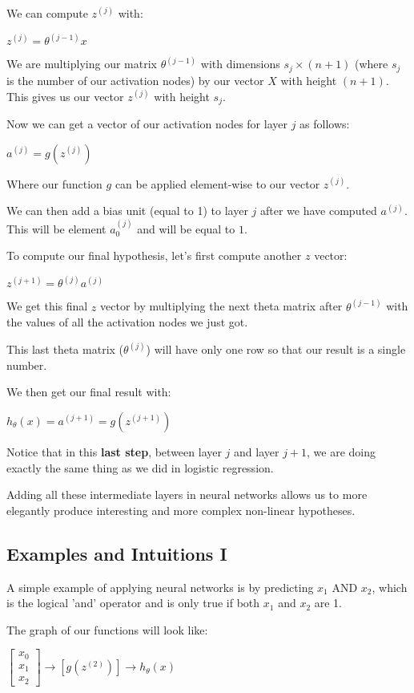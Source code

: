 \documentclass{article}
\begin{document}
We can compute $z^{(j)}$ with:

$z^{(j)}=\theta^{(j−1)}x$

We are multiplying our matrix $\theta^{(j−1)}$ with dimensions $s_j×(n+1)$ (where $s_j$ is the number of our activation nodes) by our vector $X$ with height $(n+1)$. This gives us our vector $z^{(j)}$ with height $s_j$.

Now we can get a vector of our activation nodes for layer $j$ as follows:

$a^{(j)}=g(z^{(j)})$

Where our function $g$ can be applied element-wise to our vector $z^{(j)}$.

We can then add a bias unit (equal to 1) to layer $j$ after we have computed $a^{(j)}$. This will be element $a_0^{(j)}$ and will be equal to $1$.

To compute our final hypothesis, let's first compute another $z$ vector:

$z^{(j+1)}=\theta^{(j)}a^{(j)}$

We get this final $z$ vector by multiplying the next theta matrix after $\theta^{(j−1)}$ with the values of all the activation nodes we just got.

This last theta matrix ($\theta^{(j)}$) will have only one row so that our result is a single number.

We then get our final result with:

$h_\theta(x)=a^{(j+1)}=g(z^{(j+1)})$

Notice that in this \textbf{last step}, between layer $j$ and layer $j+1$, we are doing exactly the same thing as we did in logistic regression.

Adding all these intermediate layers in neural networks allows us to more elegantly produce interesting and more complex non-linear hypotheses.
\subsection{Examples and Intuitions I}

A simple example of applying neural networks is by predicting $x_1$ AND $x_2$, which is the logical 'and' operator and is only true if both $x_1$ and $x_2$ are 1.

The graph of our functions will look like:

$\left[\begin{matrix}
x_0 \\
x_1 \\
x_2
\end{matrix}\right]
\to
\left[g(z^{(2)}) \right]
\to 
h_{\theta}(x)
$
\end{document}
